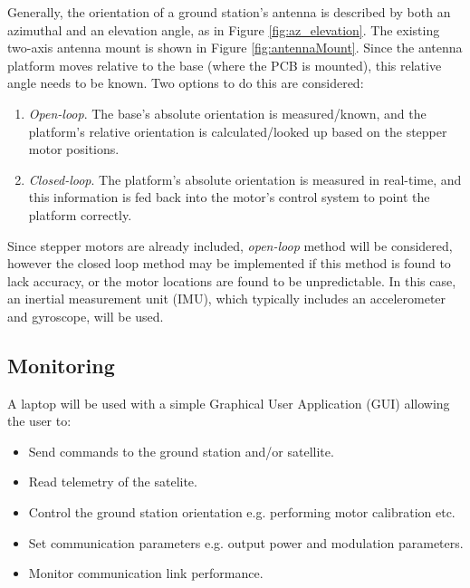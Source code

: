 Generally, the orientation of a ground station's antenna is described by both an azimuthal and an elevation angle, as in Figure \ref{fig:az_elevation}. The existing two-axis antenna mount is shown in Figure \ref{fig:antennaMount}. Since the antenna platform moves relative to the base (where the PCB is mounted), this relative angle needs to be known. Two options to do this are considered:
\begin{enumerate}
    \item \textit{Open-loop}. The base's absolute orientation is measured/known, and the platform's relative orientation is calculated/looked up based on the stepper motor positions.
    \item \textit{Closed-loop}. The platform's absolute orientation is measured in real-time, and this information is fed back into the motor's control system to point the platform correctly.
\end{enumerate}

Since stepper motors are already included, \textit{open-loop} method will be considered, however the closed loop method may be implemented if this method is found to lack accuracy, or the motor locations are found to be unpredictable. In this case, an inertial measurement unit (IMU), which typically includes an accelerometer and gyroscope, will be used.

\subsection{Monitoring}
A laptop will be used with a simple Graphical User Application (GUI) allowing the user to:
\begin{itemize}
    \item Send commands to the ground station and/or satellite.
    \item Read telemetry of the satelite.
    \item Control the ground station orientation e.g. performing motor calibration etc.
    \item Set communication parameters e.g. output power and modulation parameters.
    \item Monitor communication link performance.
\end{itemize}
